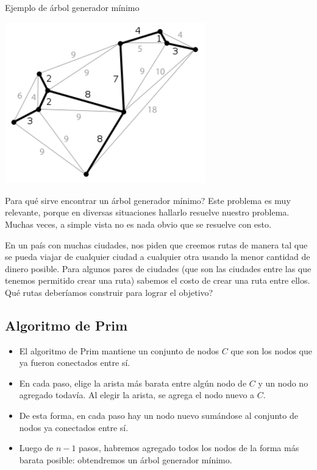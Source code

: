 \documentclass[compress]{beamer}
\begin{document}
\begin{frame}{Ejemplo de árbol generador mínimo}
\begin{center}
\includegraphics[height=7cm]{mst.png} \\
\end{center}
\end{frame}

\begin{frame}{\textquestiondown Para qué sirve encontrar un árbol generador mínimo?}
Este problema es muy relevante, porque en diversas situaciones hallarlo
resuelve nuestro problema. Muchas veces, a simple vista no es nada obvio
que se resuelve con esto.

\bigskip

En un país con muchas ciudades, nos piden que creemos rutas de manera tal que
se pueda viajar de cualquier ciudad a cualquier otra usando la menor cantidad
de dinero posible. Para algunos pares de ciudades (que son las ciudades entre las
que tenemos permitido crear una ruta) sabemos el costo de crear una ruta entre ellos.
\textquestiondown Qué rutas deberíamos construir para lograr el objetivo?

\end{frame}

\subsection{Algoritmo de Prim}
\begin{frame}

\begin{itemize}
\item El algoritmo de Prim mantiene un conjunto de nodos $C$ que son los nodos que
ya fueron conectados entre sí. 
\item En cada paso, elige la arista más barata entre algún nodo de $C$ y un 
nodo no agregado todavía. Al elegir la arista, se agrega el nodo nuevo a $C$. 
\item De esta forma, en cada paso hay un nodo nuevo sumándose al 
conjunto de nodos ya conectados entre sí. 
\item Luego de $n-1$ pasos, habremos agregado todos los nodos de la forma más
barata posible: obtendremos un árbol generador mínimo.
\end{itemize}

\end{frame}
\end{document}
